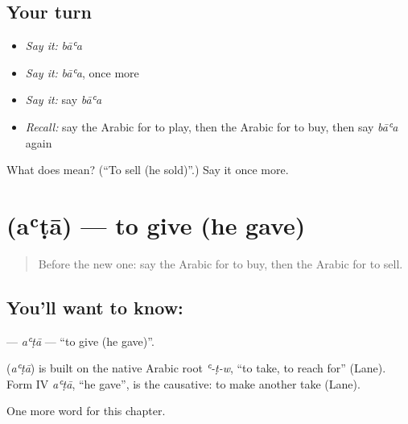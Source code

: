 \subsection*{Your turn}
\begin{itemize}
\raggedright
  \item \emph{Say it:} \emph{bāʿa}
  \item \emph{Say it:} \emph{bāʿa}, once more
  \item \emph{Say it:} say \emph{bāʿa}
  \item \emph{Recall:} say the Arabic for to play, then the Arabic for to buy, then say \emph{bāʿa} again
\end{itemize}

\begin{tcolorbox}[breakable,colback=teal!4,colframe=teal!35!black,title={Before you move on}]
What does  mean? (\textquotedblleft{}To sell (he sold)\textquotedblright{}.) Say it once more.
\end{tcolorbox}
\section[\texorpdfstring{\ar{أعطى} (aʿṭā)}{أعطى (aʿṭā)}]{ (aʿṭā) — to give (he gave)}

\label{lesson:AR-C59-ata}



\begin{quote}
Before the new one: say the Arabic for to buy, then the Arabic for to sell.
\end{quote}

\subsection*{You'll want to know: }
\textbf{} — \emph{aʿṭā} — \textquotedblleft{}to give (he gave)\textquotedblright{}.

\begin{cousinweb}
\textbf{} (\emph{aʿṭā}) is built on the native Arabic root \emph{ʿ-ṭ-w}, \textquotedblleft{}to take, to reach for\textquotedblright{} (Lane). Form IV \emph{aʿṭā}, \textquotedblleft{}he gave\textquotedblright{}, is the causative: to make another take (Lane).
\end{cousinweb}

\begin{grammarlens}[title={What you've built}]
One more word for this chapter.
\end{grammarlens}

